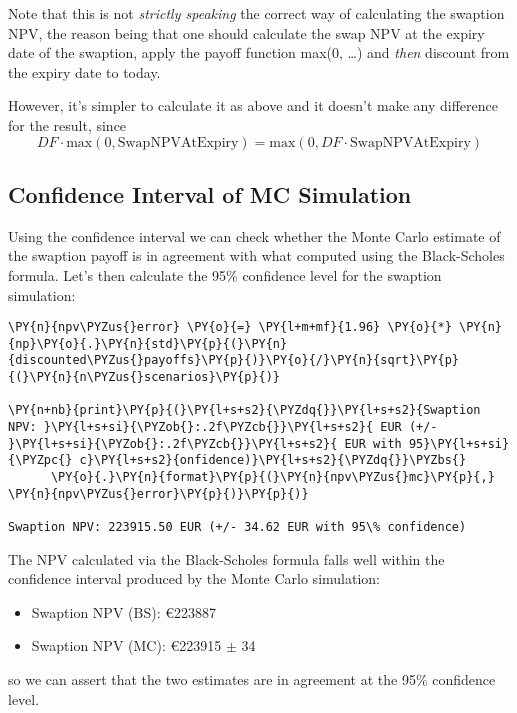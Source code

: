 Note that this is not \emph{strictly speaking} the correct way of
calculating the swaption NPV, the reason being that one should calculate
the swap NPV at the expiry date of the swaption, apply the payoff
function max(0, \ldots{}) and \emph{then} discount from the expiry date
to today.

However, it's simpler to calculate it as above and it doesn't make any
difference for the result, since
\[ DF\cdot \mathrm{max}(0, \mathrm{SwapNPVAtExpiry}) = \mathrm{max}(0, DF \cdot\mathrm{SwapNPVAtExpiry}) \]

\subsection{Confidence Interval of MC Simulation}

Using the confidence interval we can check whether the Monte Carlo estimate of the swaption payoff is in agreement with what computed using the Black-Scholes formula.
Let's then calculate the 95\% confidence level for the swaption simulation:

\begin{tcolorbox}[breakable, size=fbox, boxrule=1pt, pad at break*=1mm,colback=cellbackground, colframe=cellborder]
\begin{Verbatim}[commandchars=\\\{\}]
\PY{n}{npv\PYZus{}error} \PY{o}{=} \PY{l+m+mf}{1.96} \PY{o}{*} \PY{n}{np}\PY{o}{.}\PY{n}{std}\PY{p}{(}\PY{n}{discounted\PYZus{}payoffs}\PY{p}{)}\PY{o}{/}\PY{n}{sqrt}\PY{p}{(}\PY{n}{n\PYZus{}scenarios}\PY{p}{)}
				
\PY{n+nb}{print}\PY{p}{(}\PY{l+s+s2}{\PYZdq{}}\PY{l+s+s2}{Swaption NPV: }\PY{l+s+si}{\PYZob{}:.2f\PYZcb{}}\PY{l+s+s2}{ EUR (+/- }\PY{l+s+si}{\PYZob{}:.2f\PYZcb{}}\PY{l+s+s2}{ EUR with 95}\PY{l+s+si}{\PYZpc{} c}\PY{l+s+s2}{onfidence)}\PY{l+s+s2}{\PYZdq{}}\PYZbs{}
      \PY{o}{.}\PY{n}{format}\PY{p}{(}\PY{n}{npv\PYZus{}mc}\PY{p}{,} \PY{n}{npv\PYZus{}error}\PY{p}{)}\PY{p}{)}

Swaption NPV: 223915.50 EUR (+/- 34.62 EUR with 95\% confidence)
\end{Verbatim}
\end{tcolorbox}

The NPV calculated via the Black-Scholes formula
falls well within the confidence interval produced by the Monte Carlo
simulation:

\begin{itemize}
\tightlist
\item
  Swaption NPV (BS): \euro{223887}
\item
  Swaption NPV (MC): \euro{223915} $\pm$ 34
\end{itemize}
so we can assert that the two estimates are in agreement at the 95\% confidence level.
